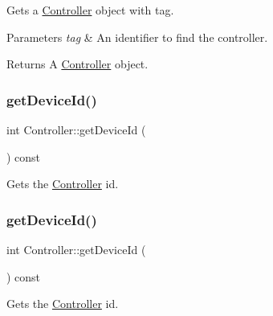 Gets a \hyperlink{classController}{Controller} object with tag.


\begin{DoxyParams}{Parameters}
{\em tag} & An identifier to find the controller. \\
\hline
\end{DoxyParams}
\begin{DoxyReturn}{Returns}
A \hyperlink{classController}{Controller} object. 
\end{DoxyReturn}
\mbox{\label{classController_adcfe0c2c19b7d32167f6937e9d8c2afd}} 
\subsubsection{\texorpdfstring{get\+Device\+Id()}{getDeviceId()}\hspace{0.1cm}{\footnotesize\ttfamily [1/2]}}
{\footnotesize\ttfamily int Controller\+::get\+Device\+Id (\begin{DoxyParamCaption}{ }\end{DoxyParamCaption}) const\hspace{0.3cm}{\ttfamily [inline]}}

Gets the \hyperlink{classController}{Controller} id. \mbox{\label{classController_adcfe0c2c19b7d32167f6937e9d8c2afd}} 
\subsubsection{\texorpdfstring{get\+Device\+Id()}{getDeviceId()}\hspace{0.1cm}{\footnotesize\ttfamily [2/2]}}
{\footnotesize\ttfamily int Controller\+::get\+Device\+Id (\begin{DoxyParamCaption}{ }\end{DoxyParamCaption}) const\hspace{0.3cm}{\ttfamily [inline]}}

Gets the \hyperlink{classController}{Controller} id. \mbox{\label{classController_a58c7b72640130609ca3c039b256ce2b1}} 
